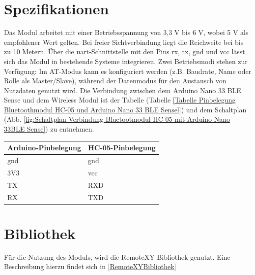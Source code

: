 \section{Spezifikationen}

Das Modul arbeitet mit einer Betriebsspannung von 3,3 V bis 6 V, wobei 5 V als empfohlener Wert gelten. Bei freier Sichtverbindung liegt die Reichweite bei bis zu 10 Metern. Über die \ac{uart}-Schnittstelle mit den Pins \ac{rx}, \ac{tx}, \ac{gnd} und \ac{vcc} lässt sich das Modul in bestehende Systeme integrieren. Zwei Betriebsmodi stehen zur Verfügung: Im AT-Modus kann es konfiguriert werden (z.B. Baudrate, Name oder Rolle als Master/Slave), während der Datenmodus für den Austausch von Nutzdaten genutzt wird. \cite{ITeadStudio:2010}
Die Verbindung zwischen dem Arduino Nano 33 BLE Sense und dem Wireless Modul ist der Tabelle (Tabelle \ref{Tabelle Pinbelegung Bluetoothmodul HC-05 und Arduino Nano 33 BLE Sensel}) und dem Schaltplan (Abb. \ref{fig:Schaltplan Verbindung Bluetootmodul HC-05 mit Arduino Nano 33BLE Sense}) zu entnehmen.

\begin{center}
	
	\label{fig:Schaltplan Verbindung Bluetootmodul HC-05 mit Arduino Nano 33BLE Sense}
\end{center}

\begin{center}
	\begin{tabular}{l|l}
		Arduino-Pinbelegung & HC-05-Pinbelegung \\ \hline
		\ac{gnd}& \ac{gnd}\\
		3V3 & \ac{vcc} \\
		TX &   RXD\\
		RX & TXD\\
	\end{tabular}
	\label{Tabelle Pinbelegung Bluetoothmodul HC-05 und Arduino Nano 33 BLE Sensel}
\end{center}


\section{Bibliothek}

Für die Nutzung des Moduls, wird die RemoteXY-Bibliothek genutzt. Eine Beschreibung hierzu findet sich in \ref{RemoteXYBibliothek}

